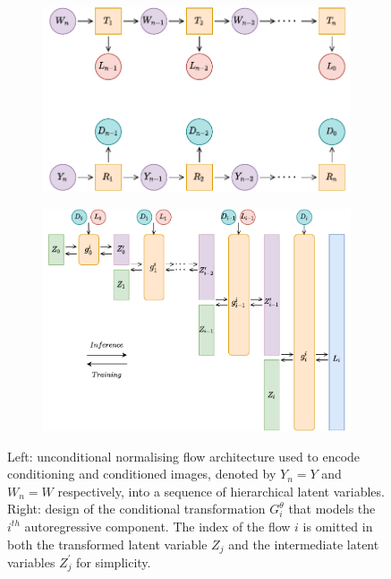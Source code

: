 \begin{figure}[h]
    \centering
    \begin{subfigure}{0.45\textwidth}
        \includegraphics[width=\textwidth]{Outline/figures/caflow/dual_glow.pdf}
    \end{subfigure}%
    \qquad 
    \begin{subfigure}{0.47\textwidth}
            \includegraphics[width=\textwidth]{Outline/figures/caflow/high_level_design_conditional_modified.pdf}
    \end{subfigure}
    \caption{Left: unconditional normalising flow architecture used to encode conditioning and conditioned images, denoted by $Y_n = Y$ and $W_n = W$ respectively, into a sequence of hierarchical latent variables. Right: design of the conditional transformation $G_{i}^\theta$ that models the $i^{th}$ autoregressive component. The index of the flow $i$ is omitted in both the transformed latent variable $Z_j$ and the intermediate latent variables $Z_j^{\prime}$ for simplicity.}
           \label{fig:high_level_design_conditional}
    \end{figure}

